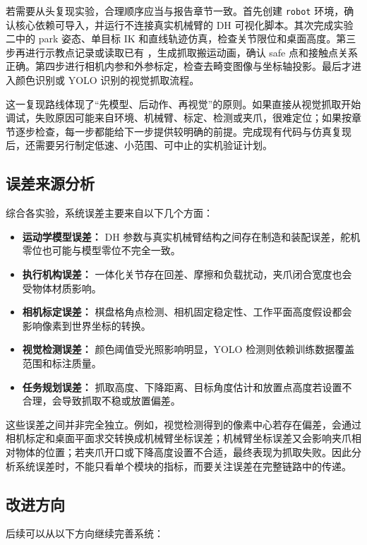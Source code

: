 若需要从头复现实验，合理顺序应当与报告章节一致。首先创建 \texttt{robot} 环境，确认核心依赖可导入，并运行不连接真实机械臂的 DH 可视化脚本。其次完成实验二中的 park 姿态、单目标 IK 和直线轨迹仿真，检查关节限位和桌面高度。第三步再进行示教点记录或读取已有 ，生成抓取搬运动画，确认 safe 点和接触点关系正确。第四步进行相机内参和外参标定，检查去畸变图像与坐标轴投影。最后才进入颜色识别或 YOLO 识别的视觉抓取流程。

这一复现路线体现了“先模型、后动作、再视觉”的原则。如果直接从视觉抓取开始调试，失败原因可能来自环境、机械臂、标定、检测或夹爪，很难定位；如果按章节逐步检查，每一步都能给下一步提供较明确的前提。完成现有代码与仿真复现后，还需要另行制定低速、小范围、可中止的实机验证计划。

\subsection{误差来源分析}

综合各实验，系统误差主要来自以下几个方面：

\begin{itemize}
  \item \textbf{运动学模型误差：} DH 参数与真实机械臂结构之间存在制造和装配误差，舵机零位也可能与模型零位不完全一致。
  \item \textbf{执行机构误差：} 一体化关节存在回差、摩擦和负载扰动，夹爪闭合宽度也会受物体材质影响。
  \item \textbf{相机标定误差：} 棋盘格角点检测、相机固定稳定性、工作平面高度假设都会影响像素到世界坐标的转换。
  \item \textbf{视觉检测误差：} 颜色阈值受光照影响明显，YOLO 检测则依赖训练数据覆盖范围和标注质量。
  \item \textbf{任务规划误差：} 抓取高度、下降距离、目标角度估计和放置点高度若设置不合理，会导致抓取不稳或放置偏差。
\end{itemize}

这些误差之间并非完全独立。例如，视觉检测得到的像素中心若存在偏差，会通过相机标定和桌面平面求交转换成机械臂坐标误差；机械臂坐标误差又会影响夹爪相对物体的位置；若夹爪开口或下降高度设置不合适，最终表现为抓取失败。因此分析系统误差时，不能只看单个模块的指标，而要关注误差在完整链路中的传递。

\subsection{改进方向}

后续可以从以下方向继续完善系统：

